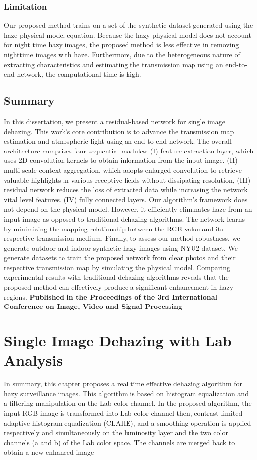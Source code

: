 \documentclass[doctor,english,listoffigures,listoftables]{thesis-uestc}
\begin{document}
\subsection{ Limitation}
Our proposed method trains on a  set of the synthetic dataset generated using the haze physical model equation. Because the hazy physical model does not account for night time hazy images, the proposed method is less effective in removing nighttime images with haze. Furthermore, due to the heterogeneous nature of extracting characteristics and estimating the transmission map using an end-to-end network, the computational time is high.

\section{Summary}\label{5}
In this dissertation, we present a residual-based network for single image dehazing. This work's core contribution is to advance the transmission map estimation and atmospheric light using an end-to-end network. The overall architecture comprises four sequential modules: (I) feature extraction layer, which uses 2D convolution kernels to obtain information from the input image. (II) multi-scale context aggregation, which adopts enlarged convolution to retrieve valuable highlights in various receptive fields without dissipating resolution, (III) residual network reduces the loss of extracted data while increasing the network vital level features. (IV) fully connected layers. Our algorithm's framework does not depend on the physical model. However, it efficiently eliminates haze from an input image as opposed to traditional dehazing algorithms. The network learns by minimizing the mapping relationship between the RGB value and its respective transmission medium. Finally, to assess our method robustness, we generate outdoor and indoor synthetic hazy images using NYU2 dataset. We generate datasets to train the proposed network from clear photos and their respective transmission map by simulating the physical model. Comparing experimental results with traditional dehazing algorithms reveals that the proposed method can effectively produce a significant enhancement in hazy regions. \textbf{Published in the Proceedings of the 3rd International Conference on Image, Video and Signal Processing}


\chapter{Single Image Dehazing with Lab Analysis}
In summary, this chapter proposes a real time effective dehazing algorithm for hazy surveillance images. This algorithm is based on histogram equalization and a filtering manipulation on the Lab color channel. In the proposed algorithm, the input RGB image is transformed into Lab color channel then, contrast limited adaptive histogram equalization (CLAHE), and a smoothing operation is applied respectively and simultaneously on the luminosity layer and the two color channels (a and b) of the Lab color space. The channels are merged back to obtain a new enhanced image
\end{document}
